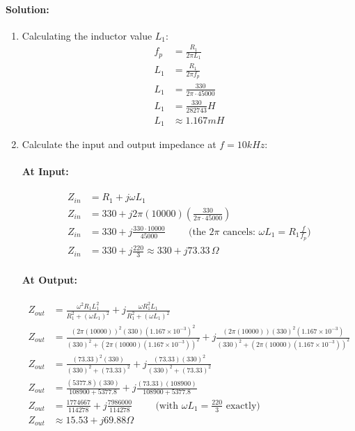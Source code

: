 \paragraph{Solution:}
\begin{enumerate}
  \item Calculating the inductor value \(L_1\):
    \begin{align*}
      f_p &= \frac{R_1}{2 \pi L_1} \\
      L_1 &= \frac{R_1}{2 \pi f_p} \\
      L_1 &= \frac{330}{2 \pi \cdot 45000} \\
      L_1 &= \frac{330}{282743} H \\
      L_1 &\approx 1.167 mH
    \end{align*}
  \item Calculate the input and output impedance at
    \(f = 10kHz\):
    \paragraph{At Input:}
      \begin{align*}
        Z_{in} &= R_1 + j \omega L_1 \\
        Z_{in} &= 330 + j 2 \pi (10000) \left(\frac{330}{2 \pi \cdot 45000}\right) \\
        Z_{in} &= 330 + j \frac{330 \cdot 10000}{45000} \hspace{1cm} \text{(the \(2\pi\) cancels: \(\omega L_1 = R_1 \frac{f}{f_p}\))} \\
        Z_{in} &= 330 + j \frac{220}{3} \approx 330 + j 73.33 \, \Omega
      \end{align*}
    \paragraph{At Output:}
      \begin{align*}
        Z_{out} &= \frac{\omega^2 R_1 L_1^2}{R_1^2 + (\omega L_1)^2} + j \frac{\omega R_1^2 L_1}{R_1^2 + (\omega L_1)^2} \\
        Z_{out} &= \frac{(2 \pi (10000))^2 (330) (1.167 \times 10^{-3})^2}{(330)^2 + (2 \pi (10000) (1.167 \times 10^{-3}))^2} + j \frac{(2 \pi (10000)) (330)^2 (1.167 \times 10^{-3})}{(330)^2 + (2 \pi (10000) (1.167 \times 10^{-3}))^2} \\
        Z_{out} &= \frac{(73.33)^2 (330)}{(330)^2 + (73.33)^2} + j \frac{(73.33)(330)^2}{(330)^2 + (73.33)^2} \\
        Z_{out} &= \frac{(5377.8)(330)}{108900 + 5377.8} + j \frac{(73.33)(108900)}{108900 + 5377.8} \\
        Z_{out} &= \frac{1774667}{114278} + j \frac{7986000}{114278} \hspace{1cm} \text{(with \(\omega L_1 = \frac{220}{3}\) exactly)} \\
        Z_{out} &\approx 15.53 + j 69.88 \Omega
      \end{align*}
\end{enumerate}

